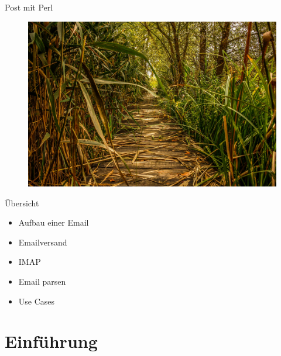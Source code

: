 \usepackage{minted}

\date{Nordic Perl Workshop 2018, Oslo, 6th September}


\maketitle

\begin{frame}
  \titlepage
\end{frame}

\cleardoublepage

\tableofcontents

\cleardoublepage


\begin{frame}{Post mit Perl}
  \begin{figure}[!ht]
    \centering
    \includegraphics[width=0.9\linewidth]{img/swamp-1706114_1920.jpg}
  \end{figure}
\end{frame}



\begin{frame}{Übersicht}
  \begin{itemize}
  \item Aufbau einer Email
  \item Emailversand
  \item IMAP
  \item Email parsen
  \item Use Cases  
  \end{itemize}
\end{frame}

\section{Einführung}

